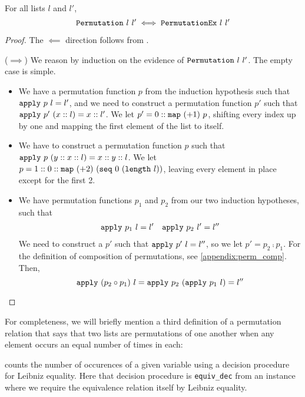 \documentclass[11pt]{thesis}
\begin{document}
\begin{theorem}
  For all lists $l$ and $l'$,
  \begin{equation*}
    \texttt{Permutation}~l~l' \iff \texttt{PermutationEx}~l~l'
  \end{equation*}
\end{theorem}
\begin{proof}
  The $\impliedby$ direction follows from .

  ($\implies$) We reason by induction on the evidence of
  $\texttt{Permutation}~l~l'$. The empty case is simple.
  \begin{itemize}
  \item We have a permutation function $p$ from the induction
    hypothesis such that $\texttt{apply}~p~l = l'$, and we need to
    construct a permutation function $p'$ such that
    $\texttt{apply}~p'~(x::l) = x :: l'$. We let $p' = 0 ::
    \texttt{map}~(+1)~p$, shifting every index up by one and mapping
    the first element of the list to itself.
  \item We have to construct a permutation function $p$ such that
    $\texttt{apply}~p~(y :: x :: l) = x :: y :: l$. We let $p = 1 :: 0 ::
    \texttt{map}~(+2)~(\texttt{seq}~0~(\texttt{length}~l))$, leaving every
    element in place except for the first 2.
  \item We have permutation functions $p_1$ and $p_2$ from our two
    induction hypotheses, such that
    \begin{align*}
      \texttt{apply}~p_1~l = l' && \texttt{apply}~p_2~l' = l''
    \end{align*}
    We need to construct a $p'$ such that $\texttt{apply}~p'~l=l''$, so
    we let $p' = p_2 \comp p_1$. For the definition of composition of
    permutations, see \cref{appendix:perm_comp}. Then,
    \begin{equation*}
      \texttt{apply}~(p_2 \circ p_1)~l =
      \texttt{apply}~p_2~(\texttt{apply}~p_1~l) = l'' \qedhere
    \end{equation*}
  \end{itemize}
\end{proof}

For completeness, we will briefly mention a third definition of a
permutation relation that says that two lists are permutations of one
another when any element occurs an equal number of times in each:

 counts the number of occurences of a given variable
using a decision procedure for Leibniz equality. Here that decision
procedure is \texttt{equiv\_dec} from an  instance where we
require the equivalence relation itself by Leibniz equality.
\end{document}
